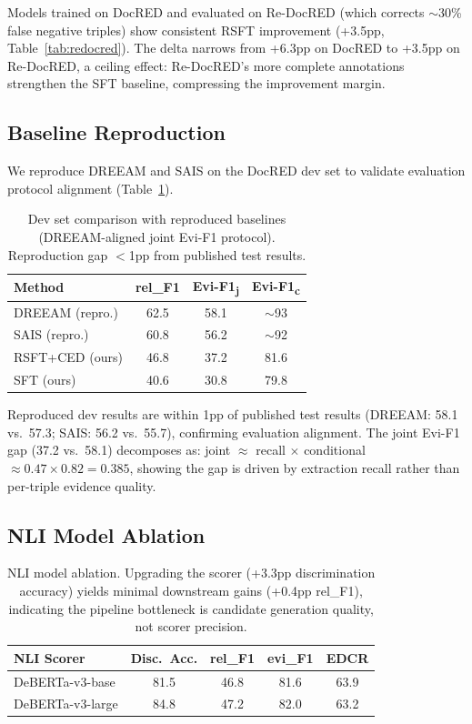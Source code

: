 \documentclass[11pt]{article}
\begin{document}
Models trained on DocRED and evaluated on Re-DocRED (which corrects ${\sim}$30\% false negative triples) show consistent RSFT improvement (+3.5pp, Table~\ref{tab:redocred}).
The delta narrows from +6.3pp on DocRED to +3.5pp on Re-DocRED, a ceiling effect: Re-DocRED's more complete annotations strengthen the SFT baseline, compressing the improvement margin.

\subsection{Baseline Reproduction}

We reproduce DREEAM and SAIS on the DocRED dev set to validate evaluation protocol alignment (Table~\ref{tab:baseline_repro}).

\begin{table}[t]
\centering
\small
\begin{tabular}{lccc}
\toprule
\textbf{Method} & \textbf{rel\_F1} & \textbf{Evi-F1\textsubscript{j}} & \textbf{Evi-F1\textsubscript{c}} \\
\midrule
DREEAM (repro.) & 62.5 & 58.1 & ${\sim}$93 \\
SAIS (repro.) & 60.8 & 56.2 & ${\sim}$92 \\
RSFT+CED (ours) & 46.8 & 37.2 & 81.6 \\
SFT (ours) & 40.6 & 30.8 & 79.8 \\
\bottomrule
\end{tabular}
\caption{Dev set comparison with reproduced baselines (DREEAM-aligned joint Evi-F1 protocol). Reproduction gap $<$1pp from published test results.}
\label{tab:baseline_repro}
\end{table}

Reproduced dev results are within 1pp of published test results (DREEAM: 58.1 vs.\ 57.3; SAIS: 56.2 vs.\ 55.7), confirming evaluation alignment.
The joint Evi-F1 gap (37.2 vs.\ 58.1) decomposes as: joint $\approx$ recall $\times$ conditional $\approx 0.47 \times 0.82 = 0.385$, showing the gap is driven by extraction recall rather than per-triple evidence quality.

\subsection{NLI Model Ablation}

\begin{table}[t]
\centering
\small
\begin{tabular}{lcccc}
\toprule
\textbf{NLI Scorer} & \textbf{Disc.\ Acc.} & \textbf{rel\_F1} & \textbf{evi\_F1} & \textbf{EDCR} \\
\midrule
DeBERTa-v3-base & 81.5 & 46.8 & 81.6 & 63.9 \\
DeBERTa-v3-large & 84.8 & 47.2 & 82.0 & 63.2 \\
\bottomrule
\end{tabular}
\caption{NLI model ablation. Upgrading the scorer (+3.3pp discrimination accuracy) yields minimal downstream gains (+0.4pp rel\_F1), indicating the pipeline bottleneck is candidate generation quality, not scorer precision.}
\label{tab:nli_ablation}
\end{table}
\end{document}
